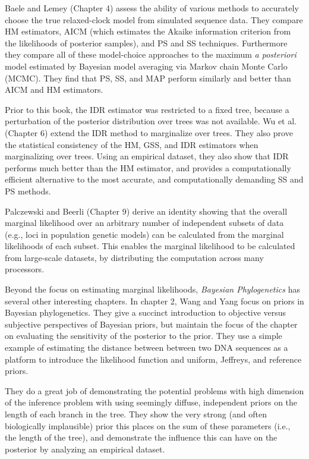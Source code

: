\documentclass[letterpaper,12pt]{article}
\newcommand{\booktitle}{\textit{Bayesian Phylogenetics}\xspace}
\begin{document}
Baele and Lemey (Chapter 4) assess the ability of various methods to accurately
choose the true relaxed-clock model from simulated sequence data.
They compare HM estimators, AICM (which estimates the Akaike information criterion
from the likelihoods of posterior samples), and PS and SS techniques.
Furthermore they compare all of these model-choice approaches to the maximum
\emph{a posteriori} model estimated by Bayesian model averaging via Markov
chain Monte Carlo (MCMC).
They find that PS, SS, and MAP perform similarly and better than AICM
and HM estimators.

Prior to this book,
the IDR estimator was restricted to a fixed tree, because a perturbation of the
posterior distribution over trees was not available.
Wu et al. (Chapter 6) extend the IDR method to marginalize over trees.
They also prove the statistical consistency of the HM, GSS, and IDR estimators
when marginalizing over trees.
Using an empirical dataset, they also show that IDR performs much better than
the HM estimator, and provides a computationally efficient alternative to the
most accurate, and computationally demanding SS and PS methods.

Palczewski and Beerli (Chapter 9) derive an identity showing that the overall
marginal likelihood over an arbitrary number of independent subsets of 
data (e.g., loci in population genetic models) can be calculated from
the marginal likelihoods of each subset. 
This enables the marginal likelihood to be calculated from large-scale
datasets, by distributing the computation across many processors.

Beyond the focus on estimating marginal likelihoods, \booktitle has several
other interesting chapters.
In chapter 2, Wang and Yang focus on priors in Bayesian phylogenetics.
They give a succinct introduction to objective versus subjective perspectives
of Bayesian priors, but maintain the focus of the chapter on evaluating
the sensitivity of the posterior to the prior.
They use a simple example of estimating the distance between between
two DNA sequences as a platform to introduce the likelihood function
and uniform, Jeffreys, and reference priors.

They do a great job of demonstrating the potential problems
with high dimension of the inference problem
with
using seemingly diffuse, independent priors on the length
of each branch in the tree.
They show the very strong (and often biologically implausible) prior
this places on the sum of these parameters (i.e., the length of the tree),
and demonstrate the influence this can have on the posterior by
analyzing an empirical dataset.
\end{document}
